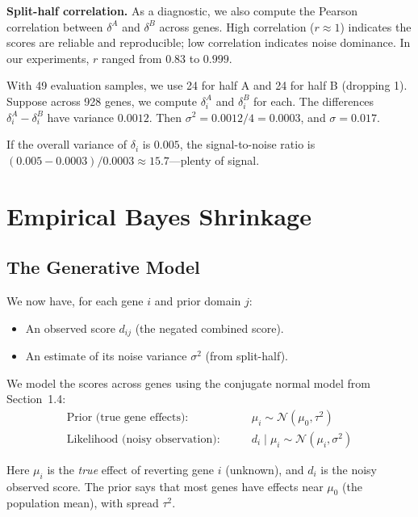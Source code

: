 \documentclass[11pt,letterpaper]{article}
\theoremstyle{definition}
\begin{document}
\textbf{Split-half correlation.} As a diagnostic, we also compute the Pearson correlation between $\delta^A$ and $\delta^B$ across genes. High correlation ($r \approx 1$) indicates the scores are reliable and reproducible; low correlation indicates noise dominance. In our experiments, $r$ ranged from $0.83$ to $0.999$.

\begin{tcolorbox}[exbox]
With 49 evaluation samples, we use 24 for half A and 24 for half B (dropping 1). Suppose across 928 genes, we compute $\delta^A_i$ and $\delta^B_i$ for each. The differences $\delta^A_i - \delta^B_i$ have variance $0.0012$. Then $\sigma^2 = 0.0012 / 4 = 0.0003$, and $\sigma = 0.017$.

If the overall variance of $\delta_i$ is $0.005$, the signal-to-noise ratio is $(0.005 - 0.0003) / 0.0003 \approx 15.7$---plenty of signal.
\end{tcolorbox}


\section{Empirical Bayes Shrinkage}
\label{sec:bayes}

\subsection{The Generative Model}

We now have, for each gene $i$ and prior domain $j$:
\begin{itemize}[nosep]
  \item An observed score $d_{ij}$ (the negated combined score).
  \item An estimate of its noise variance $\sigma^2$ (from split-half).
\end{itemize}

We model the scores across genes using the conjugate normal model from Section~1.4:
\begin{align}
\text{Prior (true gene effects):} \qquad & \mu_i \sim \mathcal{N}(\mu_0, \tau^2) \label{eq:molli_prior}\\
\text{Likelihood (noisy observation):} \qquad & d_i \mid \mu_i \sim \mathcal{N}(\mu_i, \sigma^2) \label{eq:molli_lik}
\end{align}

Here $\mu_i$ is the \emph{true} effect of reverting gene $i$ (unknown), and $d_i$ is the noisy observed score. The prior says that most genes have effects near $\mu_0$ (the population mean), with spread $\tau^2$.
\end{document}
